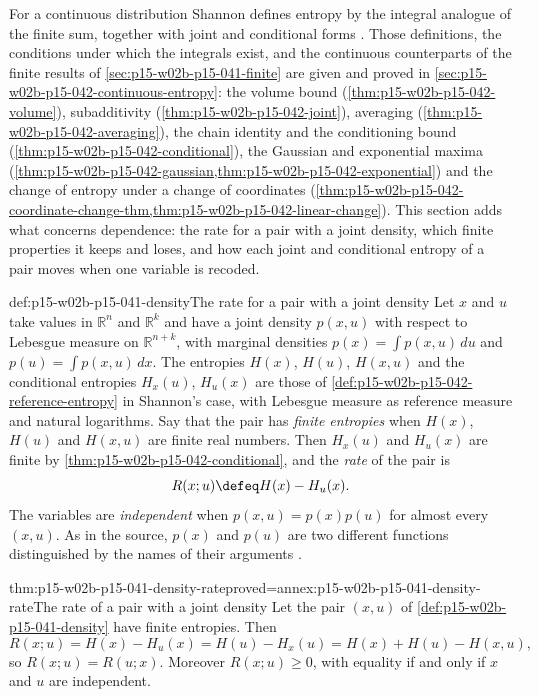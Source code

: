 For a continuous distribution Shannon defines entropy by the integral
analogue of the finite sum, together with joint and conditional forms
\cite[p.~35]{Shannon1948MathematicalTheory}. Those definitions, the
conditions under which the integrals exist, and the continuous
counterparts of the finite results of
\cref{sec:p15-w02b-p15-041-finite} are given and proved in
\cref{sec:p15-w02b-p15-042-continuous-entropy}: the volume bound
(\cref{thm:p15-w02b-p15-042-volume}), subadditivity
(\cref{thm:p15-w02b-p15-042-joint}), averaging
(\cref{thm:p15-w02b-p15-042-averaging}), the chain identity and the
conditioning bound (\cref{thm:p15-w02b-p15-042-conditional}), the
Gaussian and exponential maxima
(\cref{thm:p15-w02b-p15-042-gaussian,thm:p15-w02b-p15-042-exponential})
and the change of entropy under a change of coordinates
(\cref{thm:p15-w02b-p15-042-coordinate-change-thm,thm:p15-w02b-p15-042-linear-change}).
This section adds what concerns dependence: the rate for a pair with a
joint density, which finite properties it keeps and loses, and how each
joint and conditional entropy of a pair moves when one variable is
recoded.

\begin{hbdefinition}{def:p15-w02b-p15-041-density}{The rate for a pair with a joint density}
Let \(x\) and \(u\) take values in \(\mathbb R^n\) and \(\mathbb R^k\)
and have a joint density \(p(x,u)\) with respect to Lebesgue measure on
\(\mathbb R^{n+k}\), with marginal densities \(p(x)=\int p(x,u)\,du\)
and \(p(u)=\int p(x,u)\,dx\). The entropies \(H(x)\), \(H(u)\),
\(H(x,u)\) and the conditional entropies \(H_x(u)\), \(H_u(x)\) are those
of \cref{def:p15-w02b-p15-042-reference-entropy} in Shannon's case, with
Lebesgue measure as reference measure and natural logarithms. Say that the pair has
\emph{finite entropies} when \(H(x)\), \(H(u)\) and \(H(x,u)\) are
finite real numbers. Then \(H_x(u)\) and \(H_u(x)\) are finite by
\cref{thm:p15-w02b-p15-042-conditional}, and the \emph{rate} of the
pair is
\[
 R(x;u)\defeq H(x)-H_u(x).
\]
The variables are \emph{independent} when \(p(x,u)=p(x)p(u)\) for almost
every \((x,u)\). As in the source, \(p(x)\) and \(p(u)\) are two
different functions distinguished by the names of their arguments
\cite[p.~35]{Shannon1948MathematicalTheory}.
\end{hbdefinition}

\begin{hbtheorem}{thm:p15-w02b-p15-041-density-rate}{proved=annex:p15-w02b-p15-041-density-rate}{The rate of a pair with a joint density}
Let the pair \((x,u)\) of \cref{def:p15-w02b-p15-041-density} have
finite entropies. Then
\[
 R(x;u)=H(x)-H_u(x)=H(u)-H_x(u)=H(x)+H(u)-H(x,u),
\]
so \(R(x;u)=R(u;x)\). Moreover \(R(x;u)\geq0\), with equality if and only
if \(x\) and \(u\) are independent.
\end{hbtheorem}

